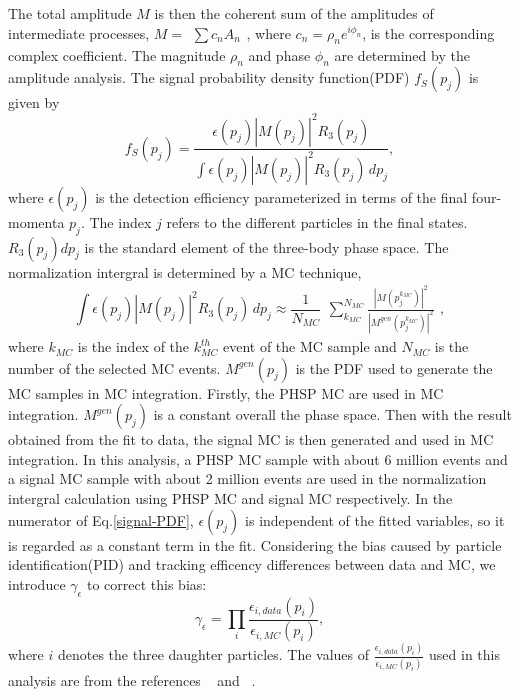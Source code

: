 {The total amplitude $M$ is then the coherent sum of the amplitudes of intermediate processes, $M=\begin{matrix}\sum c_{n}A_{n}\end{matrix}$, where $c_{n}=\rho_{n}e^{i\phi_{n}}$, is the corresponding complex coefficient. The magnitude $\rho_{n}$ and phase $\phi_{n}$ are determined by the amplitude analysis. 
    The signal probability density function(PDF) $f_{S}(p_{j})$ is given by 
    \begin{equation}
        f_{S}(p_{j}) = \frac{\epsilon(p_{j})\left|M(p_{j})\right|^{2}R_{3}(p_{j})}{\int \epsilon(p_{j})\left|M(p_{j})\right|^{2}R_{3}(p_{j})\,dp_{j}}, \label{signal-PDF}
    \end{equation}
    where $\epsilon(p_{j})$ is the detection efficiency parameterized in terms of the final four-momenta $p_{j}$. The index $j$ refers to the different particles in the final states. $R_{3}(p_{j})dp_{j}$ is the standard element of the three-body phase space. The normalization intergral is determined by a MC technique,
    \begin{equation}
    \int \epsilon(p_{j})\left|M(p_{j})\right|^{2}R_{3}(p_{j})\,dp_{j} \approx \frac{1}{N_{MC}} \begin{matrix}\sum_{k_{MC}}^{N_{MC}} \frac{\left|M(p_{j}^{k_{MC}})\right|^{2}}{\left|M^{gen}(p_{j}^{k_{MC}})\right|^{2}}\end{matrix}, \label{MC-intergral}
    \end{equation}
    where $k_{MC}$ is the index of the $k_{MC}^{th}$ event of the MC sample and $N_{MC}$ is the number of the selected MC events.  
    $M^{gen}(p_{j})$ is the PDF used to generate the MC samples in MC integration.
    Firstly, the PHSP MC are used in MC integration. $M^{gen}(p_{j})$ is a constant overall the phase space.
    Then with the result obtained from the fit to data, the signal MC is then generated and used in MC integration.
    In this analysis, a PHSP MC sample with about 6 million events and  a signal MC sample with about 2 million events are used in the normalization intergral calculation using PHSP MC and signal MC respectively.
    In the numerator of Eq.\ref{signal-PDF}, $\epsilon(p_{j})$ is independent of the fitted variables, so it is regarded as a constant term in the fit.
    Considering the bias caused by particle identification(PID) and tracking efficency differences between data and MC, we introduce $\gamma_{\epsilon}$ to correct this bias:
    \begin{equation}
        \gamma_{\epsilon} = \prod_{i} \frac{\epsilon_{i, data}(p_{i})}{\epsilon_{i, MC}(p_{i})}, \label{experimental-effect}
    \end{equation}
    where $i$ denotes the three daughter particles. The values of $\frac{\epsilon_{i, data}(p_{i})}{\epsilon_{i, MC}(p_{i})}$ used in this analysis are from the references ~\cite{PID} and ~\cite{Tracking}.

}
